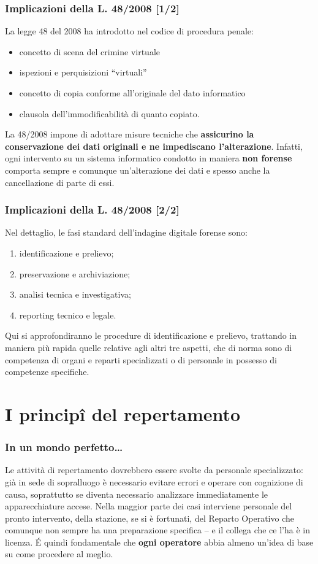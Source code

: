 \documentclass[11pt]{beamer}
\begin{document}
	\begin{frame}
		\frametitle{Implicazioni della L. 48/2008 [1/2]}
		La legge 48 del 2008 ha introdotto nel codice di procedura penale:
		\begin{itemize}
		\item concetto di scena del crimine virtuale
		\item ispezioni e perquisizioni ``virtuali''
		\item concetto di copia conforme all'originale del dato informatico
		\item clausola dell'immodificabilità di quanto copiato.
		\end{itemize}		
		\vfill
		La 48/2008 impone di adottare misure tecniche che \textbf{assicurino la conservazione dei dati originali e ne impediscano l'alterazione}.
		\vfill
		Infatti, ogni intervento su un sistema informatico  condotto in maniera \textbf{non forense} comporta sempre e comunque un'alterazione dei dati e spesso anche la cancellazione di parte di essi.
	\end{frame}
	\begin{frame}
		\frametitle{Implicazioni della L. 48/2008 [2/2]}	
		Nel dettaglio, le fasi standard dell'indagine digitale forense sono:
		\begin{enumerate}
			\item identificazione e prelievo;
			\item preservazione e archiviazione;
			\item analisi tecnica e investigativa;
			\item reporting tecnico e legale.
		\end{enumerate}
		\vfill
		Qui si approfondiranno le procedure di identificazione e prelievo, trattando in maniera più rapida quelle relative agli altri tre aspetti, che di norma sono di competenza di organi e reparti specializzati o di personale in possesso di competenze specifiche.
	\end{frame}
	
	\section{I princip\^{i} del repertamento}
	
	\begin{frame}
		\frametitle{In un mondo perfetto\dots}
		Le attività di repertamento dovrebbero essere svolte da personale specializzato: già in sede di sopralluogo è necessario evitare errori e operare con cognizione di causa, soprattutto se diventa necessario analizzare immediatamente le apparecchiature accese.
		\vfill
		Nella maggior parte dei casi interviene personale del pronto intervento, della stazione, se si è fortunati, del Reparto Operativo che comunque non sempre ha una preparazione specifica -- e il collega che ce l'ha è in licenza. 
		\vfill
		\'{E} quindi fondamentale che \textbf{ogni operatore} abbia almeno un'idea di base su come procedere al meglio.
	\end{frame}
	
\end{document}
